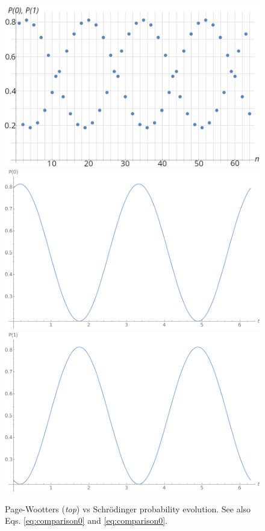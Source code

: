 \begin{figure}
  \centering
  \includegraphics[height=.3\textheight]{img/N32-B-largelabels.png}
  \includegraphics[height=.3\textheight]{img/probB_0.png}
  \includegraphics[height=.3\textheight]{img/probB_1.png}
  \caption[
    Page-Wootters vs Schr{\"o}dinger probability evolution
  ]{
    Page-Wootters ({\it top}) vs Schr{\"o}dinger probability evolution. %
    See also Eqs. \eqref{eq:comparison0} and \eqref{eq:comparison0}.
  }
  \label{fig:prob-comparison}
\end{figure}

